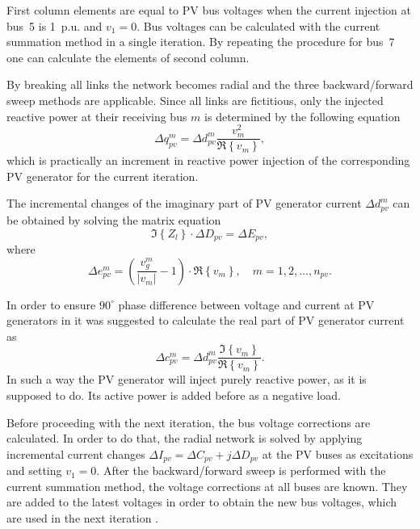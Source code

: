 \documentclass[12pt]{article}
\numberwithin{equation}{section}
\numberwithin{table}{section}
\numberwithin{figure}{section}
\begin{document}
First column elements are equal to PV bus voltages when the current injection at bus~5 is 1~p.u. and $v_1 = 0$. Bus voltages can be calculated with the current summation method in a single iteration. By repeating the procedure for bus~7 one can calculate the elements of second column.

By breaking all links the network becomes radial \cite{luo1990} and the three backward/forward sweep methods are applicable. Since all links are fictitious, only the injected reactive power at their receiving bus $m$ is determined \cite{rajicic1994} by the following equation
\begin{equation}
\Delta q_{pv}^m = \Delta d_{pv}^m \frac{v_m^2}{\Re \left\{ v_m \right\} },
\end{equation}
which is practically an increment in reactive power injection of the corresponding PV generator for the current iteration.

The incremental changes of the imaginary part of PV generator current $\Delta d_{pv}^m$ can be obtained by solving the matrix equation
\begin{equation}
\Im \left\{ Z_l \right\}  \cdot \Delta D_{pv} = \Delta E_{pv},
\end{equation}
where
\begin{equation}
\Delta e_{pv}^m = \left( \frac{v_g^m}{ \left| v_m \right|  } - 1 \right) \cdot \Re \left\{ v_m \right\}, \quad m = 1, 2, \ldots , n_{pv}.
\end{equation}

In order to ensure $90^\circ$ phase difference between voltage and current at PV generators in \cite{Rajicic2001} it was suggested to calculate the real part of PV generator current as
\begin{equation}
\Delta c_{pv}^m = \Delta d_{pv}^m \frac{\Im \left\{ v_m \right\}}{\Re \left\{ v_m \right\}}.
\end{equation}
In such a way the PV generator will inject purely reactive power, as it is supposed to do. Its active power is added before as a negative load.

Before proceeding with the next iteration, the bus voltage corrections are calculated. In order to do that, the radial network is solved by applying incremental current changes $\Delta I_{pv} =  \Delta C_{pv} + j \Delta D_{pv}$ at the PV buses as excitations and setting $v_1 = 0$. After the backward/forward sweep is performed with the current summation method, the voltage corrections at all buses are known. They are added to the latest voltages in order to obtain the new bus voltages, which are used in the next iteration \cite{rajicic1994}.
\end{document}

